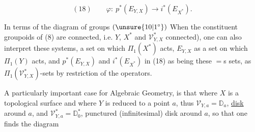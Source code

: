 \[
(18)\qquad \varphi:\ p^*(E_{Y,X})\longrightarrow i^*(E_{X^*}).
\]

In terms of the diagram of groups
$(\unsure{10|1^\circ})$ When the  constituent groupoids of
(8) are connected, i.e. $Y$, $X^*$ and $\mathcal V^*_{Y,X}$
connected), one can also interpret
these systems, 
a set on which $\Pi_1(X^*)$ acts, $E_{Y,X}$
as a set on which $\Pi_1(Y)$ acts,
and $p^*(E_{Y,X})$ and $i^*(E_{X^*})$ in (18) as
being these $=$s sets,  as
$\Pi_1(\mathcal V^*_{Y,X})$-sets  by restriction
of the operators.


A  particularly important case
for   Algebraic Geometry,
is that where $X$ is a topological
surface and where $Y$ is reduced to a point $a$,
thus $\mathcal V_{Y,a}=\mathbb D_a$, \uline{disk}  around $a$,
and $\mathcal V^*_{Y,a}=\mathbb D^*_0$, punctured (infinitesimal) disk around
$a$, so that one finds the diagram
